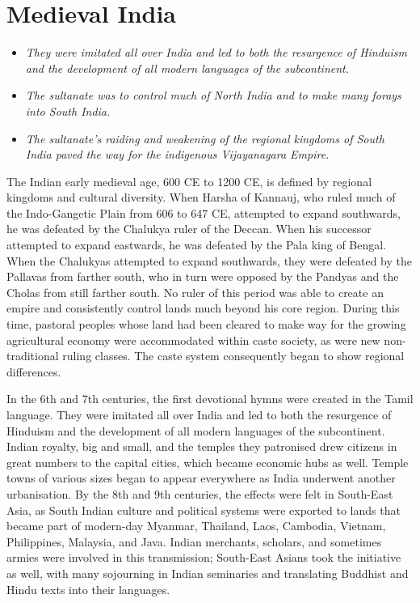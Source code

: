 \section{Medieval India}\label{medieval-india}

\begin{itemize}
\item
  \emph{They were imitated all over India and led to both the resurgence
  of Hinduism and the development of all modern languages of the
  subcontinent.}
\item
  \emph{The sultanate was to control much of North India and to make
  many forays into South India.}
\item
  \emph{The sultanate's raiding and weakening of the regional kingdoms
  of South India paved the way for the indigenous Vijayanagara Empire.}
\end{itemize}

The Indian early medieval age, 600 CE to 1200 CE, is defined by regional
kingdoms and cultural diversity. When Harsha of Kannauj, who ruled much
of the Indo-Gangetic Plain from 606 to 647 CE, attempted to expand
southwards, he was defeated by the Chalukya ruler of the Deccan. When
his successor attempted to expand eastwards, he was defeated by the Pala
king of Bengal. When the Chalukyas attempted to expand southwards, they
were defeated by the Pallavas from farther south, who in turn were
opposed by the Pandyas and the Cholas from still farther south. No ruler
of this period was able to create an empire and consistently control
lands much beyond his core region. During this time, pastoral peoples
whose land had been cleared to make way for the growing agricultural
economy were accommodated within caste society, as were new
non-traditional ruling classes. The caste system consequently began to
show regional differences.

In the 6th and 7th centuries, the first devotional hymns were created in
the Tamil language. They were imitated all over India and led to both
the resurgence of Hinduism and the development of all modern languages
of the subcontinent. Indian royalty, big and small, and the temples they
patronised drew citizens in great numbers to the capital cities, which
became economic hubs as well. Temple towns of various sizes began to
appear everywhere as India underwent another urbanisation. By the 8th
and 9th centuries, the effects were felt in South-East Asia, as South
Indian culture and political systems were exported to lands that became
part of modern-day Myanmar, Thailand, Laos, Cambodia, Vietnam,
Philippines, Malaysia, and Java. Indian merchants, scholars, and
sometimes armies were involved in this transmission; South-East Asians
took the initiative as well, with many sojourning in Indian seminaries
and translating Buddhist and Hindu texts into their languages.

